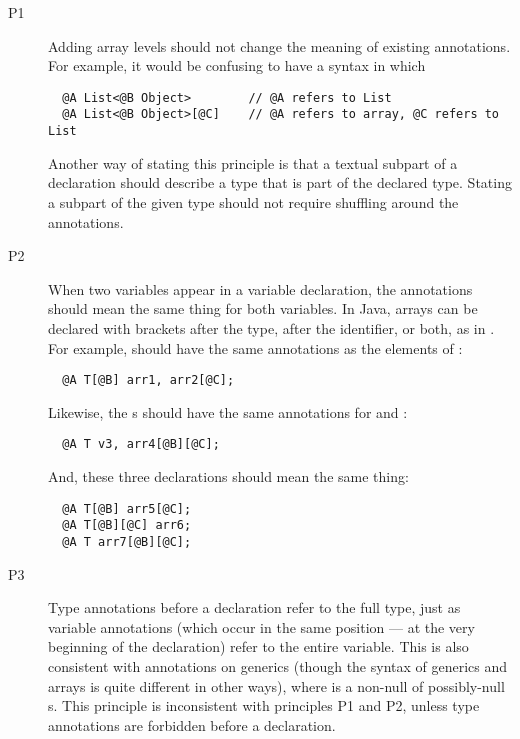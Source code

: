\newcommand{\arrayAddLevelsPrinciple}{P1}
\newcommand{\multipleVariablesPrinciple}{P2}
\newcommand{\wholeTypePrinciple}{P3}
\begin{description}
  \item[\arrayAddLevelsPrinciple]
    Adding array levels should not change the meaning of existing
    annotations.  For example, it would be confusing to have a syntax in
    which
\begin{Verbatim}
  @A List<@B Object>        // @A refers to List
  @A List<@B Object>[@C]    // @A refers to array, @C refers to List
\end{Verbatim}
Another way of stating this principle is that a textual subpart of a declaration
should describe a type that is part of the declared type.  Stating a
subpart of the given type should not require shuffling around the
annotations.

  \item[\multipleVariablesPrinciple]
    When two variables appear in a variable declaration, the annotations
    should mean the same thing for both variables.
    In Java, arrays can be declared with brackets after the type, after
    the identifier, or both, as in .  For
    example,  should have the same annotations
    as the elements of :
\begin{Verbatim}
  @A T[@B] arr1, arr2[@C];
\end{Verbatim}
\noindent
Likewise, the s should have the same annotations for  and :
\begin{Verbatim}
  @A T v3, arr4[@B][@C];
\end{Verbatim}
\noindent
And, these three declarations should mean the same thing:
\begin{Verbatim}
  @A T[@B] arr5[@C];
  @A T[@B][@C] arr6;
  @A T arr7[@B][@C];
\end{Verbatim}

  \item[\wholeTypePrinciple]
    Type annotations before a declaration refer to the full type, just as
    variable annotations (which occur in the same position --- at the very
    beginning of the declaration) refer to the entire variable.  This is
    also consistent with annotations on generics (though the syntax of
    generics and arrays is quite different in other ways), where
     is a non-null  of possibly-null
    s.  This principle is inconsistent with principles
    \arrayAddLevelsPrinciple{} and
    \multipleVariablesPrinciple{}, unless type annotations are
    forbidden before a declaration.

\end{description}

